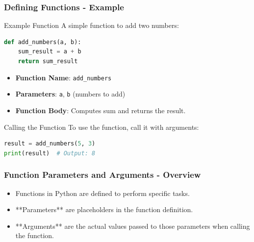 \documentclass{beamer}
\begin{document}
\begin{frame}[fragile]
    \frametitle{Defining Functions - Example}
    \begin{block}{Example Function}
        A simple function to add two numbers:
        \begin{lstlisting}[language=Python]
def add_numbers(a, b):
    sum_result = a + b
    return sum_result
        \end{lstlisting}
        \begin{itemize}
            \item \textbf{Function Name}: \texttt{add\_numbers}
            \item \textbf{Parameters}: \texttt{a}, \texttt{b} (numbers to add)
            \item \textbf{Function Body}: Computes sum and returns the result.
        \end{itemize}
    \end{block}
    
    \begin{block}{Calling the Function}
        To use the function, call it with arguments:
        \begin{lstlisting}[language=Python]
result = add_numbers(5, 3)
print(result)  # Output: 8
        \end{lstlisting}
    \end{block}
\end{frame}

\begin{frame}[fragile]
    \frametitle{Function Parameters and Arguments - Overview}
    \begin{itemize}
        \item Functions in Python are defined to perform specific tasks.
        \item **Parameters** are placeholders in the function definition.
        \item **Arguments** are the actual values passed to those parameters when calling the function.
    \end{itemize}
\end{frame}
\end{document}
